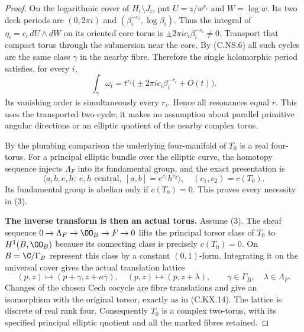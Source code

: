 \begin{proof}
On the logarithmic cover of $H_i\setminus J_i$,
put $U=z/w^{r_i}$ and $W=\log w$. Its two deck
periods are
$(0,2\pi i)$ and $(\beta_i^{-r_i},\log\beta_i)$.
Thus the integral of $\eta_i=c_i\,dU\wedge dW$
on its oriented core torus is
$\pm2\pi i c_i\beta_i^{-r_i}\ne0$.
Transport that compact torus through the
submersion near the core. By (C.NS.6) all such
cycles are the same class $\gamma$ in the
nearby fibre. Therefore the single holomorphic
period satisfies, for every $i$,
\[
        \int_\gamma\omega_t
             =t^{r_i}\bigl(\pm2\pi i c_i\beta_i^{-r_i}
                              +O(t)\bigr).              \tag{C.NS.12}
\]
Its vanishing order is simultaneously every
$r_i$. Hence all resonances equal $r$.
This uses the transported two-cycle; it makes
no assumption about parallel primitive angular
directions or an elliptic quotient of the
nearby complex torus.

By the plumbing comparison the underlying
four-manifold of $T_0$ is a real four-torus.
For a principal elliptic bundle over the
elliptic curve, the homotopy sequence injects
$\Lambda_F$ into its fundamental group, and
the exact presentation is
\[
 \langle a,b,e,h:\ e,h\text{ central},\
             [a,b]=e^{c_1}h^{c_2}\rangle,
                         \quad(c_1,c_2)=c(T_0).          \tag{C.NS.13}
\]
Its fundamental group is abelian only if
$c(T_0)=0$. This proves every necessity in (3).

\par\medskip\noindent\textbf{The inverse transform is then an actual torus.}
Assume (3). The sheaf sequence
$0\to\Lambda_F\to\OO_B\to F\to0$ lifts the
principal torsor class of $T_0$ to $H^1(B,\OO_B)$
because its connecting class is precisely
$c(T_0)=0$. On $B=\C/\Gamma_B$ represent this
class by a constant $(0,1)$-form. Integrating it
on the universal cover gives the actual
translation lattice
\[
 (p,z)\mapsto(p+\gamma,z+a\bar\gamma),\quad
 (p,z)\mapsto(p,z+\lambda),
       \qquad \gamma\in\Gamma_B,\quad\lambda\in\Lambda_F.
                                                        \tag{C.NS.14}
\]
Changes of the chosen Cech cocycle are fibre
translations and give an isomorphism with the
original torsor, exactly as in (C.KX.14).
The lattice is discrete of real rank four.
Consequently $T_0$ is a complex two-torus,
with its specified principal elliptic quotient
and all the marked fibres retained.


\end{proof}
